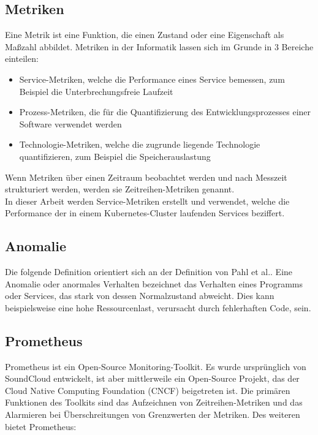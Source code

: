 \documentclass[a4paper,10pt]{scrartcl}
\begin{document}
\subsection{Metriken}
Eine Metrik ist eine Funktion, die einen Zustand oder eine Eigenschaft als Maßzahl
abbildet. Metriken in der Informatik lassen sich im Grunde in 3 Bereiche einteilen:
\begin{itemize}
\item Service-Metriken, welche die Performance eines Service bemessen, zum Beispiel die
Unterbrechungsfreie Laufzeit
\item Prozess-Metriken, die für die Quantifizierung des Entwicklungsprozesses einer Software verwendet werden
\item Technologie-Metriken, welche die zugrunde liegende Technologie quantifizieren, zum
Beispiel die Speicherauslastung
\end{itemize}

Wenn Metriken über einen Zeitraum beobachtet werden und nach Messzeit strukturiert werden, werden sie Zeitreihen-Metriken genannt.\\
In dieser Arbeit werden Service-Metriken erstellt und verwendet, welche die Performance der in einem Kubernetes-Cluster laufenden Services beziffert.


\subsection{Anomalie}

Die folgende Definition orientiert sich an der Definition von Pahl et al.\cite{.19.07.2020d}. Eine Anomalie oder anormales Verhalten bezeichnet das Verhalten eines Programms oder Services, das stark von dessen Normalzustand abweicht. Dies kann beispielsweise eine hohe Ressourcenlast, verursacht durch fehlerhaften Code, sein. 

\subsection{Prometheus}
Prometheus ist ein Open-Source Monitoring-Toolkit. Es wurde ursprünglich von SoundCloud entwickelt, ist aber mittlerweile ein Open-Source Projekt, das der Cloud Native
Computing Foundation (CNCF) beigetreten ist. Die primären Funktionen des Toolkits
sind das Aufzeichnen von Zeitreihen-Metriken und das Alarmieren bei Überschreitungen
von Grenzwerten der Metriken. Des weiteren bietet Prometheus:\\
\end{document}
